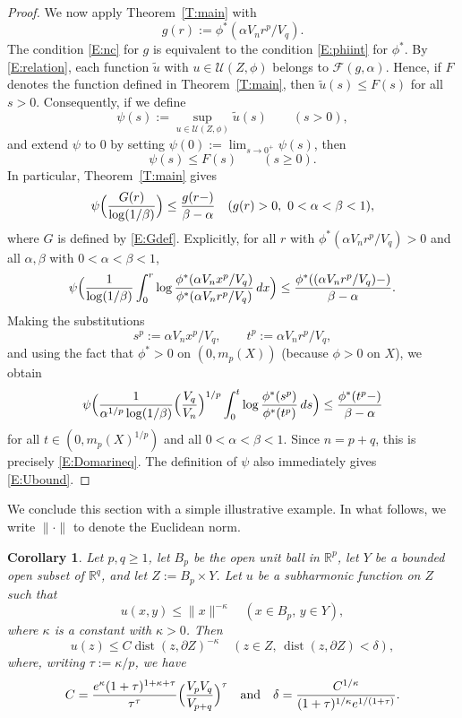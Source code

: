 \documentclass[11pt,reqno]{amsart}
\theoremstyle{plain}
\newtheorem{corollary}[theorem]{Corollary}
\theoremstyle{definition}
\theoremstyle{remark}
\newcommand{\cF}{\mathcal{F}}
\newcommand{\cU}{\mathcal{U}}
\newcommand{\RR}{\mathbb{R}}
\renewcommand{\tilde}{\widetilde}
\DeclareMathOperator{\dist}{dist}
\begin{document}
\begin{proof}
We now apply Theorem~\ref{T:main} with
\[
g(r):=\phi^*(\alpha V_n r^p/V_q).
\]
The condition \eqref{E:nc} for $g$ 
is equivalent to the condition \eqref{E:phiint} for $\phi^*$.
By \eqref{E:relation}, each function $\tilde{u}$ with $u\in\cU(Z,\phi)$ belongs to $\cF(g,\alpha)$. Hence, if 
$F$ denotes the function defined in
Theorem~\ref{T:main}, then
$\tilde{u}(s)\le F(s)$ for all $s>0$.
Consequently, if we define
\[
\psi(s):=\sup_{u\in\mathcal U(Z,\phi)}\widetilde u(s) \qquad(s>0),
\]
and extend $\psi$ to $0$ by setting $\psi(0):=\lim_{s\to0^+}\psi(s)$,
then
\[
\psi(s)\le F(s)\qquad(s\ge0).
\]
In particular, Theorem~\ref{T:main} gives
\[
\psi\Bigl(\frac{G(r)}{\log(1/\beta)}\Bigr)
\le \frac{g(r-)}{\beta-\alpha}
\quad(g(r)>0,\ 0<\alpha<\beta<1),
\]
where $G$ is defined by \eqref{E:Gdef}.
Explicitly, for all $r$ with
$\phi^*(\alpha V_n r^p/V_q)>0$ and all $\alpha,\beta$ with
$0<\alpha<\beta<1$,
\[
\psi\Bigl(\frac{1}{\log(1/\beta)}\int_0^r
\log\frac{\phi^*(\alpha V_nx^p/V_q)}
{\phi^*(\alpha V_nr^p/V_q)}\,dx\Bigr)
\le
\frac{\phi^*((\alpha V_nr^p/V_q)-)}{\beta-\alpha}.
\]
Making the substitutions
\[
s^p:=\alpha V_nx^p/V_q,
\qquad
t^p:=\alpha V_nr^p/V_q,
\]
and using the fact that $\phi^*>0$ on $(0,m_p(X))$ (because
$\phi>0$ on $X$), we obtain
\[
\psi\Bigl(\frac{1}{\alpha^{1/p}\log(1/\beta)}
\Bigl(\frac{V_q}{V_n}\Bigr)^{1/p}
\int_0^t \log\frac{\phi^*(s^p)}{\phi^*(t^p)}\,ds\Bigr)
\le
\frac{\phi^*(t^p-)}{\beta-\alpha}
\]
for all $t\in(0,m_p(X)^{1/p})$ and all
$0<\alpha<\beta<1$. Since $n=p+q$, this is precisely
\eqref{E:Domarineq}. 
The definition of $\psi$ also immediately gives
\eqref{E:Ubound}.
\end{proof}

We conclude this section with a simple illustrative example.
In what follows, we write $\|\cdot\|$ to denote the Euclidean norm.

\begin{corollary}\label{C:example}
Let $p,q\ge1$, let $B_p$ be the open unit ball in $\RR^p$,
let $Y$ be a bounded open subset of $\RR^q$, and let $Z:=B_p\times Y$.
Let $u$ be a subharmonic function on $Z$ such that
\[
u(x,y)\le \|x\|^{-\kappa} \quad(x\in B_p,\,y\in Y),
\]
where $\kappa$ is a constant with $\kappa>0$.
Then
\[
u(z)\le C\dist(z,\partial Z)^{-\kappa} \quad(z\in Z,\,\dist(z,\partial Z)<\delta),
\]
where, writing $\tau:=\kappa/p$, we have
\begin{equation}\label{E:Cdelta}
C= \frac{e^\kappa(1+\tau)^{1+\kappa+\tau}}{\tau^\tau}
\Bigl(\frac{V_pV_q}{V_{p+q}}\Bigr)^\tau 
\quad\text{and}\quad
\delta= \frac{C^{1/\kappa}}{(1+\tau)^{1/\kappa}e^{1/(1+\tau)}}.
\end{equation}
\end{corollary}
\end{document}
